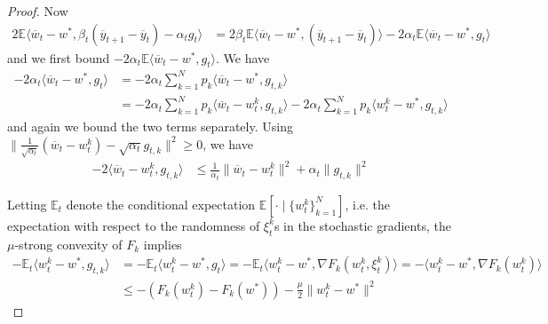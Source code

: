 \begin{proof}
	Now 
	\begin{align*}
	2\mathbb{E}\langle\overline{w}_{t}-w^{\ast},\beta_{t}(\overline{y}_{t+1}-\overline{y}_{t})-\alpha_{t}g_{t}\rangle & =2\beta_{t}\mathbb{E}\langle\overline{w}_{t}-w^{\ast},(\overline{y}_{t+1}-\overline{y}_{t})\rangle-2\alpha_{t}\mathbb{E}\langle\overline{w}_{t}-w^{\ast},g_{t}\rangle
	\end{align*}
	and we first bound $-2\alpha_{t}\mathbb{E}\langle\overline{w}_{t}-w^{\ast},g_{t}\rangle$.
	We have
	\begin{align*}
	-2\alpha_{t}\langle\overline{w}_{t}-w^{\ast},g_{t}\rangle & =-2\alpha_{t}\sum_{k=1}^{N}p_{k}\langle\overline{w}_{t}-w^{\ast},g_{t,k}\rangle\\
	& =-2\alpha_{t}\sum_{k=1}^{N}p_{k}\langle\overline{w}_{t}-w_{t}^{k},g_{t,k}\rangle-2\alpha_{t}\sum_{k=1}^{N}p_{k}\langle w_{t}^{k}-w^{\ast},g_{t,k}\rangle
	\end{align*}
	and again we bound the two terms separately. Using $\|\frac{1}{\sqrt{\alpha_{t}}}(\overline{w}_{t}-w_{t}^{k})-\sqrt{\alpha_{t}}g_{t,k}\|^{2}\geq0$,
	we have
	\begin{align*}
	-2\langle\overline{w}_{t}-w_{t}^{k},g_{t,k}\rangle & \leq\frac{1}{\alpha_{t}}\|\overline{w}_{t}-w_{t}^{k}\|^{2}+\alpha_{t}\|g_{t,k}\|^{2}
	\end{align*}
	
	Letting $\mathbb{E}_{t}$ denote the conditional expectation $\mathbb{E}\left[\cdot\mid\{w_{t}^{k}\}_{k=1}^{N}\right]$,
	i.e. the expectation with respect to the randomness of $\xi_{t}^{k}$s
	in the stochastic gradients, the $\mu$-strong convexity of $F_{k}$
	implies 
	\begin{align*}
	-\mathbb{E}_{t}\langle w_{t}^{k}-w^{\ast},g_{t,k}\rangle & =-\mathbb{E}_{t}\langle w_{t}^{k}-w^{\ast},g_{t}\rangle=-\mathbb{E}_{t}\langle w_{t}^{k}-w^{\ast},\nabla F_{k}(w_{t}^{k},\xi_{t}^{k})\rangle=-\langle w_{t}^{k}-w^{\ast},\nabla F_{k}(w_{t}^{k})\rangle\\
	& \leq-(F_{k}(w_{t}^{k})-F_{k}(w^{\ast}))-\frac{\mu}{2}\|w_{t}^{k}-w^{\ast}\|^{2}
	\end{align*}
	

\end{proof}
